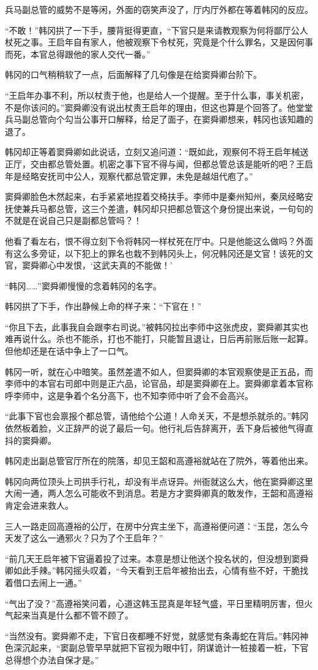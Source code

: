 兵马副总管的威势不是等闲，外面的窃笑声没了，厅内厅外都在等着韩冈的反应。

“不敢！”韩冈拱了一下手，腰背挺得更直，“下官只是来请教观察为何将鄙厅公人杖死之事。王启年自有家人，他被观察下令杖死，究竟是个什么罪名，又是因何事而死，本官总得跟他的家人交代一番。”

韩冈的口气稍稍软了一点，后面解释了几句像是在给窦舜卿台阶下。

“王启年办事不利，所以杖责于他，也是给人一个提醒。至于什么事，事关机密，不是你该问的。”窦舜卿没有说出杖责王启年的理由，但这也算是个回答了。他堂堂兵马副总管向个勾当公事开口解释，给足了面子，在窦舜卿想来，韩冈也该知趣的退了。

韩冈却正等着窦舜卿如此说话，立刻又追问道：“既如此，观察何不将王启年械送正厅，交由都总管处置。机密之事下官不得与闻，但都总管总该是能听的吧？王启年是经略安抚司中公人，观察代都总管定罪，未免是越俎代庖了。”

窦舜卿脸色木然起来，右手紧紧地捏着交椅扶手。李师中是秦州知州，秦凤经略安抚使兼兵马都总管，这三个差遣，韩冈却只把都总管这个身份提出来说，一句句的不就是在说自己只是副都总管吗？！

他看了看左右，恨不得立刻下令将韩冈一样杖死在厅中。只是他能这么做吗？外面有这么多旁证，以下犯上的罪名也栽不到韩冈头上，何况韩冈还是文官！该死的文官，窦舜卿心中发恨，‘这武夫真的不能做！’

“韩冈……”窦舜卿慢慢的念着韩冈的名字。

韩冈拱了下手，作出静候上命的样子来：“下官在！”

“你且下去，此事我自会跟李右司说。”被韩冈拉出李师中这张虎皮，窦舜卿其实也难再说什么。杀也不能杀，打也不能打，只能暂且退让，日后再前账后账一起算。但他却还是在话中争上了一口气。

韩冈一听，就在心中暗笑。虽然差遣不如人，但窦舜卿的本官观察使是正五品，而李师中的本官右司郎中则是正六品，论官品，却是窦舜卿在上。窦舜卿拿着本官称呼李师中，这是争着个名分高下，也不知李师中听了会不会高兴。

“此事下官也会禀报个都总管，请他给个公道！人命关天，不是想杀就杀的。”韩冈依然板着脸，义正辞严的说了最后一句。他行礼后告辞离开，丢下身后被他气得直抖的窦舜卿。

韩冈走出副总管官厅所在的院落，却见王韶和高遵裕就站在了院外，等着他出来。

韩冈向两位顶头上司拱手行礼，却没有半点讶异。州衙就这么大，他在窦舜卿这里大闹一通，两人怎么可能收不到消息。若是方才窦舜卿真的敢发作，王韶和高遵裕肯定会进来救人。

三人一路走回高遵裕的公厅，在房中分宾主坐下，高遵裕便问道：“玉昆，怎么今天发了这么一通邪火？只为了个王启年？”

“前几天王启年被下官逼着投了过来。本意是想让他送个投名状的，但没想到窦舜卿如此手辣。”韩冈摇头叹着，“今天看到王启年被抬出去，心情有些不好，干脆找着借口去闹上一通。”

“气出了没？”高遵裕笑问着，心道这韩玉昆真是年轻气盛，平日里精明厉害，但火气起来当真是什么都不管不顾了。

“当然没有。窦舜卿不走，下官日夜都睡不好觉，就感觉有条毒蛇在背后。”韩冈神色深沉起来，“窦副总管早早就把下官视为眼中钉，阴谋诡计一桩接着一桩，下官总得想个办法自保才是。”

